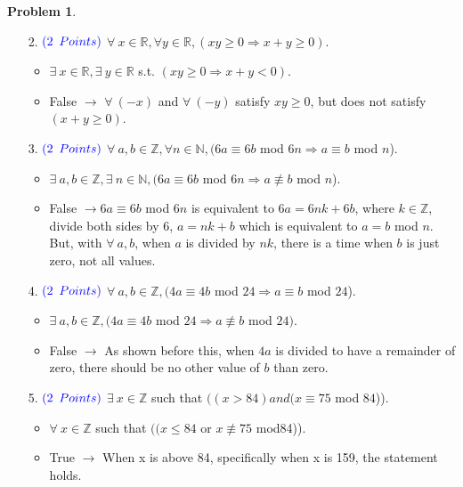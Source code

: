 \documentclass[letterpaper, 12pt]{article}
\theoremstyle{definition}
\newtheorem{pb}{Problem} %
\begin{document}
\begin{spacing}{1.33}
\begin{pb}
\begin{enumerate}
        \item[2.] $\color{blue}{(2}$ $\color{blue}{Points)}$ $ \forall \: x \in \mathbb{R}, \forall y \in \mathbb{R}, (xy \geq 0 \Longrightarrow x + y \geq 0).$
        \begin{itemize}
            \item $\exists \: x \in \mathbb{R}, \exists \: y \in \mathbb{R} $ s.t. $(xy \geq 0 \Longrightarrow x + y < 0).$
            \item False $\longrightarrow$ $\forall \: (-x)$ and $\forall \: (-y)$ satisfy $xy \geq 0$, but does not satisfy $(x + y \geq 0).$ 
        \end{itemize}
        
        \item[3.] $\color{blue}{(2}$ $\color{blue}{Points)}$ $\forall \: a, b \in \mathbb{Z}, \forall n \in \mathbb{N}, (6a \equiv 6b$ mod $6n \Longrightarrow a \equiv b$ mod $n$).
        \begin{itemize}
            \item $\exists \: a, b \in \mathbb{Z}, \exists \: n \in \mathbb{N}, (6a \equiv 6b$ mod $6n \Longrightarrow a \not\equiv b$ mod $n$).
            \item  False $\longrightarrow 6a \equiv 6b$ mod $6n$ is equivalent to $6a = 6nk + 6b$, where $k \in \mathbb{Z}$, divide both sides by 6, $a = nk + b$ which is equivalent to $a = b$ mod $n$. But, with $\forall \: a, b$, when $a$ is divided by $nk$, there is a time when $b$ is just zero, not all values.
        \end{itemize}

        \item[4.] $\color{blue}{(2}$ $\color{blue}{Points)}$ $\forall \: a, b \in \mathbb{Z},  (4a \equiv 4b$ mod $24 \Longrightarrow a \equiv b$ mod $24$). 
        \begin{itemize}
            \item $\exists \: a, b \in \mathbb{Z}, (4a \equiv 4b$ mod $24 \Longrightarrow a \not\equiv b$ mod $24)$.
            \item False $\longrightarrow$ As shown before this, when $4a$ is divided to have a remainder of zero, there should be no other value of $b$ than zero.
        \end{itemize}

        \item[5.] $\color{blue}{(2}$ $\color{blue}{Points)}$ $\exists \: x \in \mathbb{Z}$ such that $((x > 84) and (x \equiv 75$ mod $84$)).
        \begin{itemize}
            \item $\forall \: x \in \mathbb{Z}$ such that $((x \leq 84$ or $x \not\equiv 75$ mod84)).
            \item True $\longrightarrow$ When x is above 84, specifically when x is 159, the statement holds. 
        \end{itemize}
        

\end{enumerate}
\end{pb}
\end{spacing}
\end{document}
